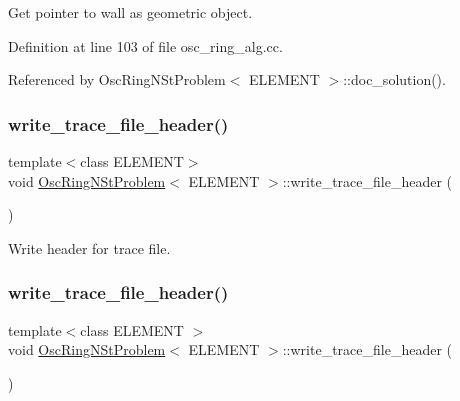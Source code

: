 Get pointer to wall as geometric object. 



Definition at line 103 of file osc\+\_\+ring\+\_\+alg.\+cc.



Referenced by Osc\+Ring\+N\+St\+Problem$<$ E\+L\+E\+M\+E\+N\+T $>$\+::doc\+\_\+solution().

\mbox{\label{classOscRingNStProblem_a96e12e5bb761d765ebe9065b9990112f}} 
\subsubsection{\texorpdfstring{write\+\_\+trace\+\_\+file\+\_\+header()}{write\_trace\_file\_header()}\hspace{0.1cm}{\footnotesize\ttfamily [1/2]}}
{\footnotesize\ttfamily template$<$class E\+L\+E\+M\+E\+NT$>$ \\
void \hyperlink{classOscRingNStProblem}{Osc\+Ring\+N\+St\+Problem}$<$ E\+L\+E\+M\+E\+NT $>$\+::write\+\_\+trace\+\_\+file\+\_\+header (\begin{DoxyParamCaption}{ }\end{DoxyParamCaption})\hspace{0.3cm}{\ttfamily [private]}}



Write header for trace file. 

\mbox{\label{classOscRingNStProblem_a96e12e5bb761d765ebe9065b9990112f}} 
\subsubsection{\texorpdfstring{write\+\_\+trace\+\_\+file\+\_\+header()}{write\_trace\_file\_header()}\hspace{0.1cm}{\footnotesize\ttfamily [2/2]}}
{\footnotesize\ttfamily template$<$class E\+L\+E\+M\+E\+NT $>$ \\
void \hyperlink{classOscRingNStProblem}{Osc\+Ring\+N\+St\+Problem}$<$ E\+L\+E\+M\+E\+NT $>$\+::write\+\_\+trace\+\_\+file\+\_\+header (\begin{DoxyParamCaption}{ }\end{DoxyParamCaption})\hspace{0.3cm}{\ttfamily [private]}}




